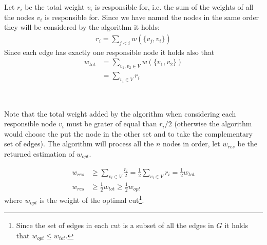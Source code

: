 \documentclass[a4paper]{article}
\begin{document}
Let $r_i$ be the total weight $v_i$ is responsible for, i.e. the sum of the weights of all the nodes $v_i$ is responsible for.
Since we have named the nodes in the same order they will be considered by the algorithm it holds:
\begin{align*}
r_i = \sum_{j < i} w(\{v_j, v_i\})
\end{align*}
Since each edge has exactly one responsible node it holds also that
\begin{align*}
w_{tot} &= \sum_{v_1, v_2 \in V} w(\{v_1, v_2\})\\
&= \sum_{v_i \in V} r_i
\end{align*}

\

\noindent
Note that the total weight added by the algorithm when considering each responsible node $v_i$ must be grater of equal than $r_i / 2$ (otherwise the algorithm would choose the put the node in the other set and to take the complementary set of edges).
The algorithm will process all the $n$ nodes in order, let $w_{res}$ be the returned estimation of $w_{opt}$.

\begin{align*}
w_{res} &\geq \sum_{v_i \in V} \frac{r_i}{2} = \frac{1}{2} \sum_{v_i \in V} r_i = \frac{1}{2} w_{tot}\\
w_{res} &\geq \frac{1}{2} w_{tot} \geq \frac{1}{2} w_{opt}
\end{align*}
where $w_{opt}$ is the weight of the optimal cut\footnote{Since the set of edges in each cut is a subset of all the edges in $G$ it holds that $w_{opt} \leq w_{tot}$.}.
\end{document}
